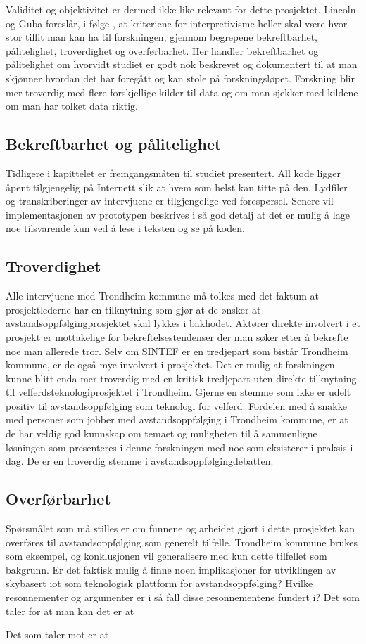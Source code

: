 Validitet og objektivitet er dermed ikke like relevant for dette prosjektet. Lincoln og Guba foreslår, i følge \citet{oates}, at kriteriene for interpretivisme
heller skal være hvor stor tillit man kan ha til forskningen, gjennom begrepene bekreftbarhet, pålitelighet, troverdighet og overførbarhet.
Her handler bekreftbarhet og pålitelighet om hvorvidt studiet er godt nok beskrevet og dokumentert til at man skjønner hvordan det har foregått og kan stole
på forskningsløpet. Forskning blir mer troverdig med flere forskjellige kilder til data og om man sjekker med kildene om man har tolket data riktig.

\subsection{Bekreftbarhet og pålitelighet}
Tidligere i kapittelet er fremgangsmåten til studiet presentert. All kode ligger åpent tilgjengelig på Internett slik at hvem som helst kan
titte på den. Lydfiler og transkriberinger av intervjuene er tilgjengelige ved forespørsel. Senere vil implementasjonen av prototypen beskrives i
så god detalj at det er mulig å lage noe tilsvarende kun ved å lese i teksten og se på koden.

\subsection{Troverdighet}
Alle intervjuene med Trondheim kommune må tolkes med det faktum at prosjektlederne har en tilknytning som gjør at de ønsker at avstandsoppfølgingprosjektet
skal lykkes i bakhodet. Aktører direkte involvert i et prosjekt er mottakelige for bekreftelsestendenser der man søker etter å bekrefte noe
man allerede tror. Selv om SINTEF er en tredjepart som bistår Trondheim kommune, er de også mye involvert i prosjektet.
Det er mulig at forskningen kunne blitt enda mer troverdig med en kritisk tredjepart uten direkte tilknytning til velferdsteknologiprosjektet i Trondheim.
Gjerne en stemme som ikke er udelt positiv til avstandsoppfølging som teknologi for velferd.
Fordelen med å snakke med personer som jobber med avstandsoppfølging i Trondheim kommune, er at de har veldig god kunnskap om temaet og muligheten til
å sammenligne løsningen som presenteres i denne forskningen med noe som eksisterer i praksis i dag. De er en troverdig stemme i avstandsoppfølgingdebatten.

\subsection{Overførbarhet}
Spørsmålet som må stilles er om funnene og arbeidet gjort i dette prosjektet kan overføres til avstandsoppfølging som generelt tilfelle.
Trondheim kommune brukes som eksempel, og konklusjonen vil generalisere med kun dette tilfellet som bakgrunn.
Er det faktisk mulig å finne noen implikasjoner for utviklingen av skybasert \gls{iot} som teknologisk plattform for avstandsoppfølging?
Hvilke resonnementer og argumenter er i så fall disse resonnementene fundert i? Det som taler for at man kan det er at

Det som taler mot er at 
